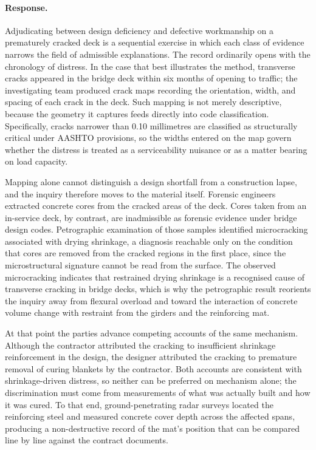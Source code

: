 \documentclass[11pt]{article}
\begin{document}
\paragraph{Response.} {\small Adjudicating between design deficiency and defective workmanship on a prematurely cracked deck is a sequential exercise in which each class of evidence narrows the field of admissible explanations. The record ordinarily opens with the chronology of distress. In the case that best illustrates the method, transverse cracks appeared in the bridge deck within six months of opening to traffic; the investigating team produced crack maps recording the orientation, width, and spacing of each crack in the deck. Such mapping is not merely descriptive, because the geometry it captures feeds directly into code classification. Specifically, cracks narrower than 0.10 millimetres are classified as structurally critical under AASHTO provisions, so the widths entered on the map govern whether the distress is treated as a serviceability nuisance or as a matter bearing on load capacity.

Mapping alone cannot distinguish a design shortfall from a construction lapse, and the inquiry therefore moves to the material itself. Forensic engineers extracted concrete cores from the cracked areas of the deck. Cores taken from an in-service deck, by contrast, are inadmissible as forensic evidence under bridge design codes. Petrographic examination of those samples identified microcracking associated with drying shrinkage, a diagnosis reachable only on the condition that cores are removed from the cracked regions in the first place, since the microstructural signature cannot be read from the surface. The observed microcracking indicates that restrained drying shrinkage is a recognised cause of transverse cracking in bridge decks, which is why the petrographic result reorients the inquiry away from flexural overload and toward the interaction of concrete volume change with restraint from the girders and the reinforcing mat.

At that point the parties advance competing accounts of the same mechanism. Although the contractor attributed the cracking to insufficient shrinkage reinforcement in the design, the designer attributed the cracking to premature removal of curing blankets by the contractor. Both accounts are consistent with shrinkage-driven distress, so neither can be preferred on mechanism alone; the discrimination must come from measurements of what was actually built and how it was cured. To that end, ground-penetrating radar surveys located the reinforcing steel and measured concrete cover depth across the affected spans, producing a non-destructive record of the mat's position that can be compared line by line against the contract documents.

}
\end{document}
